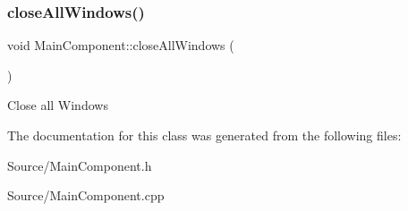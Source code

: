 \subsubsection{\texorpdfstring{closeAllWindows()}{closeAllWindows()}}
{\footnotesize\ttfamily void Main\+Component\+::close\+All\+Windows (\begin{DoxyParamCaption}{ }\end{DoxyParamCaption})}

Close all Windows 

The documentation for this class was generated from the following files\+:\begin{DoxyCompactItemize}
\item 
Source/Main\+Component.\+h\item 
Source/Main\+Component.\+cpp\end{DoxyCompactItemize}
